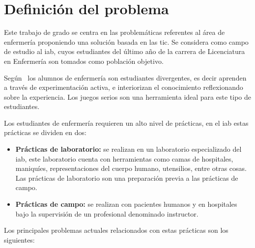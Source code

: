 \section{Definición del problema}

Este trabajo de grado se centra en las problemáticas referentes al área de
enfermería proponiendo una solución basada en las \gls{tic}. Se considera como
campo de estudio al \gls{iab}, cuyos estudiantes del último año de la carrera 
de Licenciatura en Enfermería son tomados como población objetivo.


Según~\cite{humphreys2013developing} los alumnos de enfermería son estudiantes
divergentes, es decir aprenden a través de experimentación activa, e
interiorizan el conocimiento reflexionando sobre la experiencia. Los juegos
serios son una herramienta ideal para este tipo de
estudiantes\cite{humphreys2013developing}. 

Los estudiantes de enfermería requieren un alto nivel de prácticas, en el 
\Gls{iab} estas prácticas se dividen en dos:
\begin{itemize}
\item \textbf{Prácticas de laboratorio:} se realizan en un laboratorio
especializado del \Gls{iab}, este laboratorio cuenta con herramientas como camas de hospitales, maniquíes, representaciones del cuerpo humano, utensilios, entre otras cosas. Las prácticas de laboratorio son una preparación previa a 
las prácticas de campo.
\item \textbf{Prácticas de campo:} se realizan con pacientes humanos y en 
hospitales bajo la supervisión de un profesional denominado instructor. 
\end{itemize}

Los principales problemas actuales relacionados con estas prácticas son los 
siguientes:

